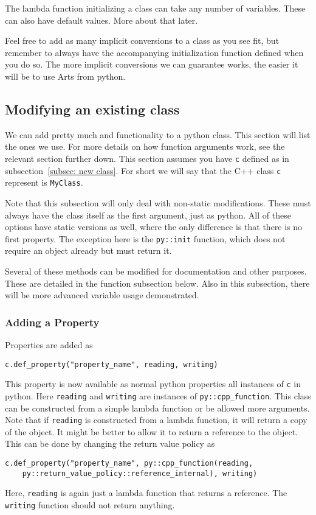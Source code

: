 The lambda function initializing a class can take any number of variables. These can also have default values.  More about that later.

Feel free to add as many implicit conversions to a class as you see fit, but remember to always have the accompanying
initialization function defined when you do so.  The more implicit conversions we can guarantee works, the easier it
will be to use Arts from python.

\subsection{Modifying an existing class}
We can add pretty much and functionality to a python class.  This section will list the ones we use.
For more details on how function arguments work, see the relevant section further down.
This section assumes you have \verb|c| defined as in subsection~\ref{subsec: new class}.  For short
we will say that the C++ class \verb|c| represent is \verb|MyClass|.

Note that this subsection will only deal with non-static modifications.  These must always have
the class itself as the first argument, just as python.  All of these options have static
versions as well, where the only difference is that there is no first property.  The exception here
is the \verb|py::init| function, which does not require an object already but must return it.

Several of these methods can be modified for documentation and other purposes.
These are detailed in the function subsection below.  Also in this subsection,
there will be more advanced variable usage demonstrated.

\subsubsection{Adding a Property}
Properties are added as
\begin{verbatim}
c.def_property("property_name", reading, writing)
\end{verbatim}
This property is now available as normal python properties all instances of \verb|c| in python.
Here \verb|reading| and \verb|writing| are instances of \verb|py::cpp_function|.  This class
can be constructed from a simple lambda function or be allowed more arguments.  Note that if \verb|reading|
is constructed from a lambda function, it will return a copy of the object.  It might be better to allow it to return
a reference to the object.  This can be done  by changing the return value policy as
\begin{verbatim}
c.def_property("property_name", py::cpp_function(reading, 
    py::return_value_policy::reference_internal), writing)
\end{verbatim}
Here, \verb|reading| is again just a lambda function that returns a reference. The 
\verb|writing| function should not return anything.

